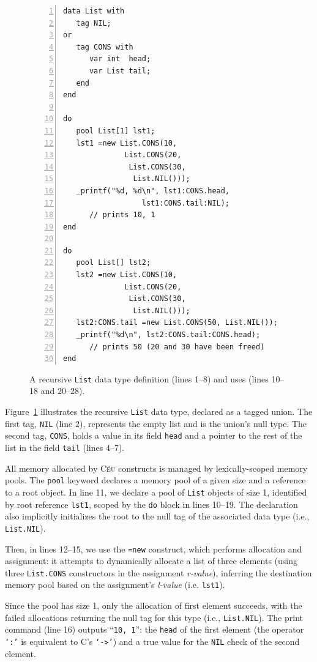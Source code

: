 \documentclass{acm_proc_article-sp}
\newcommand{\CEU}{\textsc{C\'{e}u}\xspace}
\newcommand{\code}[1] {{\small{\texttt{#1}}}}
\begin{document}
\begin{figure}[t]
\begin{lstlisting}[numbers=left,xleftmargin=3em]
data List with
   tag NIL;
or
   tag CONS with
      var int  head;
      var List tail;
   end
end

do
   pool List[1] lst1;
   lst1 =new List.CONS(10,
              List.CONS(20,
               List.CONS(30,
                List.NIL()));
   _printf("%d, %d\n", lst1:CONS.head,
                  lst1:CONS.tail:NIL);
      // prints 10, 1
end

do
   pool List[] lst2;
   lst2 =new List.CONS(10,
              List.CONS(20,
               List.CONS(30,
                List.NIL()));
   lst2:CONS.tail =new List.CONS(50, List.NIL());
   _printf("%d\n", lst2:CONS.tail:CONS.head);
      // prints 50 (20 and 30 have been freed)
end
\end{lstlisting}
\caption{
A recursive \code{List} data type definition (lines 1--8) and uses (lines 
10--18 and 20--28).
\label{lst.list}
}
\end{figure}

Figure~\ref{lst.list} illustrates the recursive \code{List} data type,
declared as a tagged union. The first tag, \code{NIL} (line 2), represents
the empty list and is the union's null type. The second tag, \code{CONS},
holds a value in its field \code{head} and a pointer to the rest of the list
in the field \code{tail} (lines 4--7).

All memory allocated by \CEU constructs is managed by lexically-scoped memory
pools. The \code{pool} keyword declares a memory pool of a given size and
a reference to a root object. In line 11, we declare a pool of \code{List}
objects of size 1, identified by root reference \code{lst1},
scoped by the \code{do} block in lines 10--19.
The declaration also implicitly initializes the root to the null tag of the 
associated data type (i.e., \code{List.NIL}).

Then, in lines 12--15, we use the \code{=new} construct, which performs
allocation and assignment: it attempts to dynamically allocate a list of
three elements (using three \code{List.CONS} constructors in the assignment
\emph{r-value}), inferring the destination memory pool based on the 
assignment's \emph{l-value} (i.e. \code{lst1}).

Since the pool has size 1, only the allocation of first element succeeds, with the failed 
allocations returning the null tag for this type (i.e., \code{List.NIL}).
The print command (line 16) outputs ``\texttt{10, 1}'': the \code{head} of the 
first element (the operator \code{`:'} is equivalent to C's \code{`->'}) and 
a true value for the \code{NIL} check of the second element.
\end{document}
